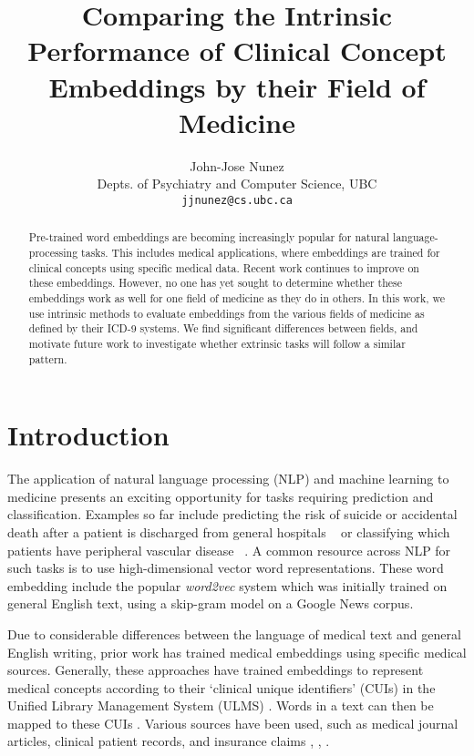 \documentclass[11pt,a4paper]{article}
\title{Comparing the Intrinsic Performance of Clinical Concept Embeddings by their Field of Medicine}
\author{John-Jose Nunez\\
  Depts. of Psychiatry and Computer Science, UBC\\
  {\tt jjnunez@cs.ubc.ca} 
}
\date{}
\begin{document}
\maketitle
\begin{abstract}
	Pre-trained word embeddings are becoming increasingly popular for natural language-processing tasks. This includes medical applications, where embeddings are trained for clinical concepts using specific medical data. Recent work continues to improve on these embeddings. However, no one has yet sought to determine whether these embeddings work as well for one field of medicine as they do in others. In this work, we use intrinsic methods to evaluate embeddings from the various fields of medicine as defined by their ICD-9 systems. We find significant differences between fields, and motivate future work to investigate whether extrinsic tasks will follow a similar pattern. 
\end{abstract}

\section{Introduction}


The application of natural language processing (NLP) and machine learning to medicine presents an exciting opportunity for tasks requiring prediction and classification. Examples so far include predicting the risk of suicide or accidental death after a patient is discharged from general hospitals ~\cite{mccoyImprovingPredictionSuicide2016} or classifying which patients have peripheral vascular disease ~\cite{afzalMiningPeripheralArterial2017}. A common resource across NLP for such tasks is to use high-dimensional vector word representations. These word embedding include the popular \emph{word2vec} system \cite{mikolovEfficientEstimationWord2013} which was initially trained on general English text, using a skip-gram model on a Google News corpus.

Due to considerable differences between the language of medical text and general English writing, prior work has trained medical embeddings using specific medical sources. Generally, these approaches have trained embeddings to represent medical concepts according to their `clinical unique identifiers' (CUIs) in the Unified Library Management System (ULMS) \cite{bodenreiderUnifiedMedicalLanguage2004}. Words in a text can then be mapped to these CUIs \cite{yuShortIntroductionNILE2013}. Various sources have been used, such as medical journal articles, clinical patient records, and insurance claims \cite{devineMedicalSemanticSimilarity2014}, \cite{minarro-gimenezExploringApplicationDeep2014},  \cite{choiLearningLowDimensionalRepresentations2016}.  
\end{document}
